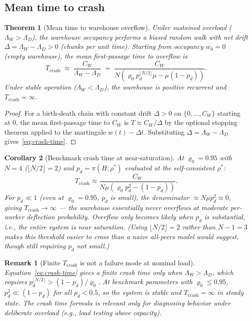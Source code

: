 \documentclass[11pt,a4paper]{article}
\newtheorem{theorem}{Theorem}[section]
\newtheorem{corollary}[theorem]{Corollary}
\newtheorem{remark}{Remark}[section]
\newcommand{\rhostar}{\rho^{*}}
\newcommand{\rhozero}{\varrho_0}
\newcommand{\pd}{p_d}
\begin{document}
\subsection{Mean time to crash}

\begin{theorem}[Mean time to warehouse overflow]
\label{thm:crash-time}
Under sustained overload ($\Lambda_W > \Lambda_D$), the warehouse
occupancy performs a biased random walk with net drift
$\Delta = \Lambda_W - \Lambda_D > 0$ (chunks per unit time).
Starting from occupancy $w_0 = 0$ (empty warehouse),
the mean first-passage time to overflow is
\begin{equation}
  T_{\mathrm{crash}}
  \;\approx\; \frac{C_W}{\Lambda_W - \Lambda_D}
  \;=\; \frac{C_W}{N(\rhozero\pd^{\lfloor N/2\rfloor}\mu - \mu(1-\pd))}.
  \label{eq:crash-time}
\end{equation}
Under stable operation ($\Lambda_W < \Lambda_D$), the warehouse is
positive recurrent and $T_{\mathrm{crash}} = \infty$.
\end{theorem}

\begin{proof}
For a birth-death chain with constant drift $\Delta > 0$ on
$\{0,\ldots,C_W\}$ starting at 0, the mean first-passage time
to $C_W$ is $T \approx C_W/\Delta$ by the optional stopping theorem
applied to the martingale $w(t) - \Delta t$.
Substituting $\Delta = \Lambda_W - \Lambda_D$ gives~\eqref{eq:crash-time}.
\end{proof}

\begin{corollary}[Benchmark crash time at near-saturation]
At $\rhozero = 0.95$ with $N=4$ ($\lfloor N/2\rfloor = 2$) and
$\pd = \pi(H;\rhostar)$ evaluated at the self-consistent $\rhostar$:
\[
  T_{\mathrm{crash}} \approx \frac{C_W}{N\mu(\rhozero\pd^2 - (1-\pd))}.
\]
For $\pd \ll 1$ (even at $\rhozero = 0.95$, $\pd$ is small),
the denominator $\approx N\mu\pd^2 \approx 0$, giving
$T_{\mathrm{crash}} \to \infty$ --- the warehouse essentially never overflows
at moderate per-worker deflection probability.
Overflow only becomes likely when $\pd$ is substantial, i.e., the entire
system is near saturation. (Using $\lfloor N/2\rfloor=2$ rather than $N-1=3$
makes this threshold easier to cross than a naive all-peers model would
suggest, though still requiring $\pd$ not small.)
\end{corollary}

\begin{remark}[Finite $T_{\mathrm{crash}}$ is not a failure mode at nominal load]
Equation~\eqref{eq:crash-time} gives a finite crash time only when
$\Lambda_W > \Lambda_D$, which requires $\pd^{\lfloor N/2\rfloor} > (1-\pd)/\rhozero$.
At benchmark parameters with $\rhozero \leq 0.95$, $\pd^2 \ll (1-\pd)$
for all $\pd < 0.5$, so the system is stable and $T_{\mathrm{crash}} = \infty$
in steady state.
The crash time formula is relevant only for diagnosing behavior under
deliberate overload (e.g., load testing above capacity).
\end{remark}
\end{document}
